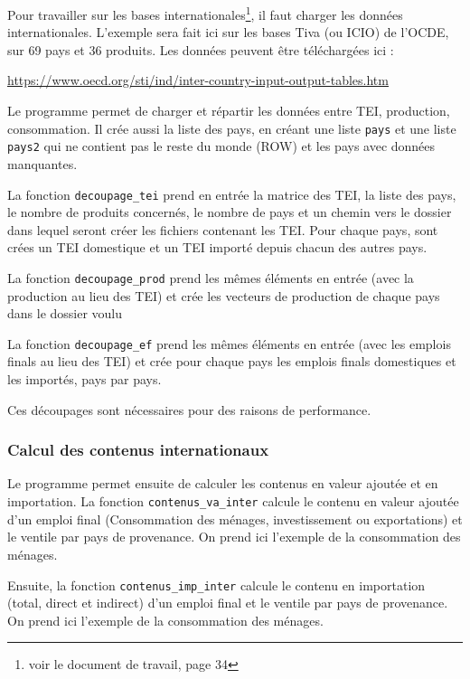 \documentclass[a4paper,french,11pt]{article}
\begin{document}
Pour travailler sur les bases internationales\footnote{voir le document de travail, page 34}, il faut charger les donn\'ees internationales. L'exemple sera fait ici sur les bases Tiva (ou ICIO) de l'OCDE, sur 69 pays et 36 produits. Les donn\'ees peuvent \^etre t\'el\'echarg\'ees ici :

\url{https://www.oecd.org/sti/ind/inter-country-input-output-tables.htm}

Le programme permet de charger et r\'epartir les donn\'ees entre TEI, production, consommation. Il cr\'ee aussi la liste des pays, en cr\'eant une liste \verb|pays| et une liste \verb|pays2| qui ne contient pas le reste du monde (ROW) et les pays avec donn\'ees manquantes.

La fonction \verb|decoupage_tei| prend en entr\'ee la matrice des TEI, la liste des pays, le nombre de produits concern\'es, le nombre de pays et un chemin vers le dossier dans lequel seront cr\'eer les fichiers contenant les TEI. Pour chaque pays, sont cr\'ees un TEI domestique et un TEI import\'e depuis chacun des autres pays.

La fonction \verb|decoupage_prod| prend les m\^emes \'el\'ements en entr\'ee (avec la production au lieu des TEI) et cr\'ee les vecteurs de production de chaque pays dans le dossier voulu


La fonction \verb|decoupage_ef| prend les m\^emes \'el\'ements en entr\'ee (avec les emplois finals au lieu des TEI) et cr\'ee pour chaque pays les emplois finals domestiques et les import\'es, pays par pays.

 Ces d\'ecoupages sont n\'ecessaires pour des raisons de performance.

\subsubsection{Calcul des contenus internationaux}

Le programme permet ensuite de calculer les contenus en valeur ajout\'ee et en importation. La fonction \verb|contenus_va_inter| calcule le contenu en valeur ajoutée d'un emploi final (Consommation des ménages, investissement ou exportations) et le ventile par pays de provenance. On prend ici l'exemple de la consommation des ménages.

Ensuite, la fonction \verb|contenus_imp_inter| calcule le contenu en importation (total, direct et indirect) d'un emploi final et le ventile par pays de provenance. On prend ici l'exemple de la consommation des ménages.
\end{document}
